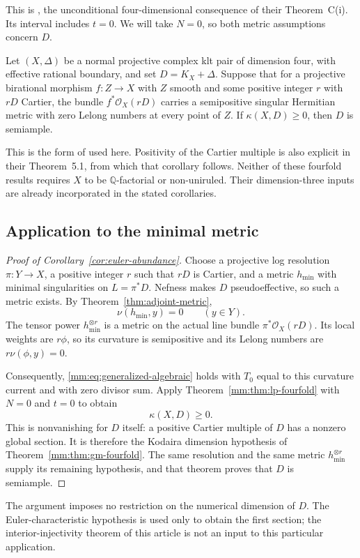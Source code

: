 This is \cite[Corollary~D]{LazicPeternell2020}, the unconditional
four-dimensional consequence of their Theorem~C(i). Its interval includes
$t=0$. We will take $N=0$, so both metric assumptions concern $D$.

\begin{theorem}
\label{mm:thm:gm-fourfold}
Let $(X,\Delta)$ be a normal projective complex klt pair of dimension
four, with effective rational boundary, and set $D=K_X+\Delta$.
Suppose that for a projective birational morphism $f:Z\to X$ with
$Z$ smooth and some positive integer $r$ with $rD$ Cartier, the bundle
$f^*\mathcal O_X(rD)$ carries a semipositive singular Hermitian metric
with zero Lelong numbers at every point of $Z$.
If $\kappa(X,D)\geq0$, then $D$ is semiample.
\end{theorem}

This is the form of \cite[Corollary~5.3]{GongyoMatsumura2017}
used here. Positivity of the Cartier multiple is also explicit in
their Theorem~5.1, from which that corollary follows. Neither of these
fourfold results requires $X$ to be $\mathbb Q$-factorial or
non-uniruled. Their dimension-three inputs are already incorporated
in the stated corollaries.

\subsection*{Application to the minimal metric}

\begin{proof}[Proof of Corollary~\ref{cor:euler-abundance}]
Choose a projective log resolution $\pi:Y\to X$, a positive integer
$r$ such that $rD$ is Cartier, and a metric $h_{\min}$ with minimal
singularities on $L=\pi^*D$. Nefness makes $D$ pseudoeffective,
so such a metric exists. By Theorem~\ref{thm:adjoint-metric},
\[
 \nu(h_{\min},y)=0\qquad(y\in Y).
\]
The tensor power $h_{\min}^{\otimes r}$ is a metric on the actual
line bundle $\pi^*\mathcal O_X(rD)$. Its local weights are $r\phi$,
so its curvature is semipositive and its Lelong numbers are
$r\nu(\phi,y)=0$.

Consequently, \eqref{mm:eq:generalized-algebraic} holds with
$T_0$ equal to this curvature current and with zero divisor sum.
Apply Theorem~\ref{mm:thm:lp-fourfold} with $N=0$ and $t=0$ to obtain
\[
 \kappa(X,D)\geq0.
\]
This is nonvanishing for $D$ itself: a positive Cartier multiple
of $D$ has a nonzero global section. It is therefore the Kodaira
dimension hypothesis of Theorem~\ref{mm:thm:gm-fourfold}. The same
resolution and the same metric $h_{\min}^{\otimes r}$ supply its
remaining hypothesis, and that theorem proves that $D$ is semiample.
\end{proof}

The argument imposes no restriction on the numerical dimension of $D$.
The Euler-characteristic hypothesis is used only to obtain the first
section; the interior-injectivity theorem of this article is not an
input to this particular application.
